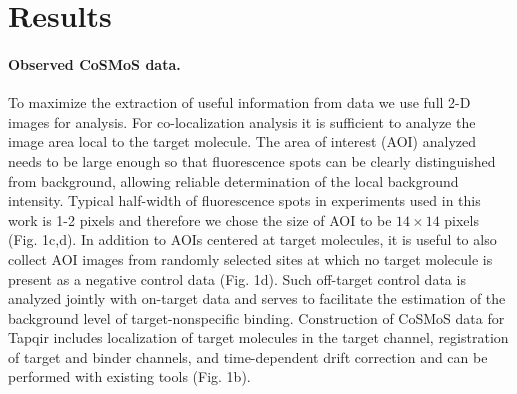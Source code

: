 \section*{Results}
\paragraph{Observed CoSMoS data.} %
To maximize the extraction of useful information from data we use full 2-D images for analysis. For co-localization analysis it is sufficient to analyze the image area local to the target molecule. The area of interest (AOI) analyzed needs to be large enough so that fluorescence spots can be clearly distinguished from background, allowing  reliable  determination of the  local  background  intensity. Typical half-width of fluorescence spots in experiments used in this work is 1-2 pixels and therefore we chose the size of AOI to be $14\times14$ pixels (Fig. 1c,d). In addition to AOIs centered at target molecules, it is useful to also collect AOI images from randomly selected sites at which no target molecule is present as a negative control data (Fig. 1d). Such off-target control data is analyzed jointly with on-target data and serves to facilitate the estimation of the background level of target-nonspecific binding. Construction of CoSMoS data for Tapqir includes localization of target molecules in the target channel, registration of target and binder channels, and time-dependent drift correction and can be performed with existing tools \cite{Friedman2015-nx, Smith2019-yb} (Fig. 1b).


